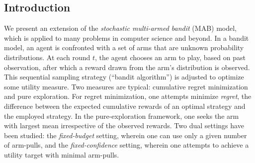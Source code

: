 

%
%
\subsection{Introduction}\label{sec-intro}

We present an extension of the \emph{stochastic multi-armed
bandit} (MAB) model, which is applied to
many problems in computer science and beyond.  In a bandit model,
an agent
is confronted with a set of arms
that are unknown probability distributions.
At each round $t$, the agent chooses an arm to play,
based on past observation, after which a reward
drawn from the arm's distribution is observed. This sequential
sampling strategy (``bandit algorithm'') is adjusted to
optimize some utility measure.
Two measures are typical: cumulative regret
minimization and pure exploration.
For regret minimization, one attempts
 minimize \emph{regret}, the difference between
the expected cumulative rewards of an
optimal strategy and the employed strategy.
In the pure-exploration framework, one seeks
the arm with largest mean irrespective of the observed rewards.
Two dual settings have been studied: the \emph{fixed-budget}
setting, wherein one
can use
only a given number of arm-pulls,
and the \emph{fixed-confidence} setting, wherein one
attempts to achieve a utility target with minimal arm-pulls.



